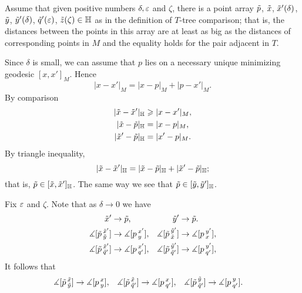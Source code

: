 \begin{comment}
\begin{wrapfigure}[7]{r}{26 mm}
\begin{tikzpicture}[scale=1,
  thick,main node/.style={circle,draw,font=\sffamily\bfseries,minimum size=7mm}]

  \node[main node] (0) at (1/6,1/2) {$x$};
   \node[main node] (1) at (1/6,3/2) {$x'$};
  \node[main node] (2) at (1,0){$y$};
  \node[main node] (3) at (1,1){$p$};
  \node[main node] (4) at (1,2) {$y'$};
  \node[main node] (5) at (2,0) {$z$};
  \node[main node] (6) at (2,1) {$q'$};

  \path[every node/.style={font=\sffamily\small}]
     (0) edge node[above]{}(3)
   (1) edge node[above]{}(3)
   (2) edge node[above]{}(3)
   (3) edge node[above]{}(6)
   (4) edge node[above]{}(3)
   (5) edge node[above]{}(6);
\end{tikzpicture}
\end{wrapfigure}
\end{comment}

Assume that given  positive numbers $\delta,\eps$ and $\zeta$, there is a point array $\~p$, $\~x$, $\~x'(\delta)$, $\~y$, $\~y'(\delta)$, $\~q'(\eps)$, $\~z(\zeta)\in\HH$ as in the definition of $T$-tree comparison;
that is, the distances between the points in this array are at least as big as the distances of corresponding points in $M$ and the equality holds for the pair adjacent in $T$.

Since $\delta$ is small, we can assume that $p$ lies on a necessary unique minimizing geodesic $[x,x']_M$.
Hence 
\[|x-x'|_M=|x-p|_M+|p-x'|_M.\]
By comparison
\begin{align*}
|\~x-\~x'|_\HH&\ge|x-x'|_M,
\\
|\~x-\~p|_\HH&=|x-p|_M,
\\
|\~x'-\~p|_\HH&=|x'-p|_M.
\end{align*}
By triangle inequality,
\[|\~x-\~x'|_\HH=|\~x-\~p|_\HH+|\~x'-\~p|_\HH;\]
that is, $\~p\in [\~x,\~x']_\HH$.
The same way we see that $\~p\in [\~y,\~y']_\HH$.

Fix $\eps$ and $\zeta$.
Note that as $\delta\to 0$ we have 
\begin{align*}
\~x'&\to \~p,
&
\~y'&\to \~p.
\\
\measuredangle[\~p\,^{\~x'}_{\~y}]&\to \measuredangle[p\,^{x'}_{y}],
&
\measuredangle[\~p\,^{\~y'}_{\~x}]&\to \measuredangle[p\,^{y'}_{x}],
\\
\measuredangle[\~p\,^{\~x'}_{\~q'}]&\to \measuredangle[p\,^{x'}_{q'}],
&
\measuredangle[\~p\,^{\~y'}_{\~q'}]&\to \measuredangle[p\,^{y'}_{q'}],
\end{align*}
It follows that 
\begin{align*}
\measuredangle[\~p\,^{\~x}_{\~y}]&\to \measuredangle[p\,^x_y],
&
\measuredangle[\~p\,^{\~x}_{\~q'}]&\to \measuredangle[p\,^x_{q'}],
&
\measuredangle[\~p\,^{\~y}_{\~q'}]&\to \measuredangle[p\,^y_{q'}].
\end{align*}


